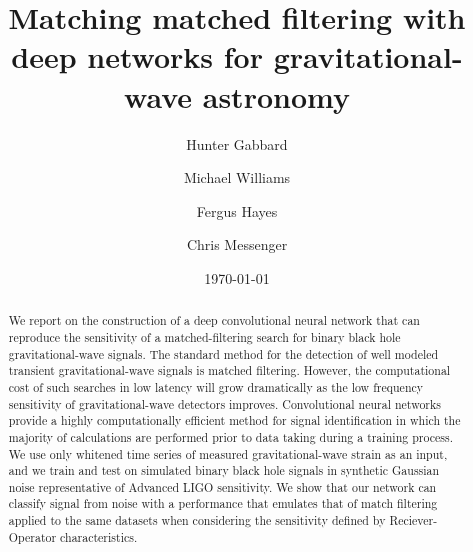 \documentclass[%
showpacs,
 amsmath,amssymb,
 aps,
 twocolumn,
 prl,
 reprint,
floatfix,
]{revtex4-1}
\newcommand{\dcc}{LIGO-P1700378}
\begin{document}

%
%
\title{Matching matched filtering with deep networks for gravitational-wave astronomy}

\author{Hunter Gabbard}
\author{Michael Williams}
\author{Fergus Hayes}
\author{Chris Messenger}

\date{\today}%


%
%
\begin{abstract} 
%
We report on the construction of a deep convolutional neural network that can
reproduce the sensitivity of a matched-filtering search for binary black hole
gravitational-wave signals. The standard method for the detection of well
modeled transient gravitational-wave signals is matched filtering. However, the
computational cost of such searches in low latency will grow dramatically as
the low frequency sensitivity of gravitational-wave detectors improves.
Convolutional neural networks provide a highly computationally efficient method
for signal identification in which the majority of calculations are performed
prior to data taking during a training process. We use only whitened time
series of measured gravitational-wave strain as an input, and we train and test
on simulated binary black hole signals in synthetic Gaussian noise
representative of Advanced LIGO sensitivity. We show that our network can
classify signal from noise with a performance that emulates that of match
filtering applied to the same datasets when considering the sensitivity defined
by Reciever-Operator characteristics.
%
\end{abstract}



\end{document}
